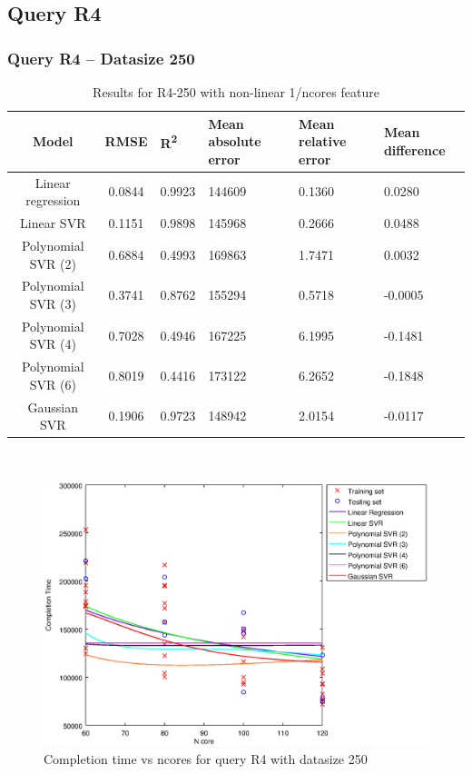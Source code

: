 \documentclass[a4paper,11pt]{article}
\begin{document}
\newpage
\subsection{Query R4}
\subsubsection{Query R4 -- Datasize 250}
\begin{table}[H]
	\centering
	\begin{adjustbox}{center}
		\begin{tabular}{c | c M{1.2cm} M{2.5cm} M{2.5cm} M{1.8cm}}
			Model & RMSE & R\textsuperscript{2} & Mean absolute error & Mean relative error & Mean difference \tabularnewline
			\hline
			Linear regression & 0.0844 & 0.9923 & 144609 & 0.1360 & 0.0280 \\
			Linear SVR & 0.1151 & 0.9898 & 145968 & 0.2666 & 0.0488 \\
			Polynomial SVR (2) & 0.6884 & 0.4993 & 169863 & 1.7471 & 0.0032 \\
			Polynomial SVR (3) & 0.3741 & 0.8762 & 155294 & 0.5718 & -0.0005 \\
			Polynomial SVR (4) & 0.7028 & 0.4946 & 167225 & 6.1995 & -0.1481 \\
			Polynomial SVR (6) & 0.8019 & 0.4416 & 173122 & 6.2652 & -0.1848 \\
			Gaussian SVR & 0.1906 & 0.9723 & 148942 & 2.0154 & -0.0117 \\
		\end{tabular}
	\end{adjustbox}
	\\
	\caption{Results for R4-250 with non-linear 1/ncores feature}
	\label{table_R4_prediction_all}
\end{table}

\begin {figure}[hbtp]
\centering
\includegraphics[width=\textwidth]{output/R4_250_NO_72_90_1_OVER_NCORES/plot_R4_250.eps}
\caption {Completion time vs ncores for query R4 with datasize 250}
\end {figure}
\end{document}
